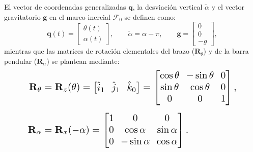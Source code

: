 El vector de coordenadas generalizadas $\mathbf{q}$, la desviación vertical $\tilde{\alpha}$ y el vector gravitatorio $\mathbf{g}$ en el marco inercial $\mathcal{F}_0$ se definen como:
\begin{equation}
    \mathbf{q}(t) = \begin{bmatrix} \theta(t) \\ \alpha(t) \end{bmatrix}, \qquad
    \tilde{\alpha} = \alpha - \pi, \qquad
    \mathbf{g} = \begin{bmatrix} 0 \\ 0 \\ -g \end{bmatrix},
    \label{eq:marco_movil}
\end{equation}
mientras que las matrices de rotación elementales del brazo ($\mathbf{R}_\theta$) y de la barra pendular ($\mathbf{R}_\alpha$) se plantean mediante:
\begin{equation}
\resizebox{0.85\columnwidth}{!}{$\displaystyle
    \setlength{\arraycolsep}{3.5pt}
    \begin{aligned}
        \mathbf{R}_\theta &= \mathbf{R}_z(\theta) = \begin{bmatrix} \hat{i}_1 & \hat{j}_1 & \hat{k}_0 \end{bmatrix}
        = \begin{bmatrix}
            \cos\theta & -\sin\theta & 0 \\
            \sin\theta & \cos\theta & 0 \\
            0 & 0 & 1
        \end{bmatrix}, \\[4pt]
        \mathbf{R}_\alpha &= \mathbf{R}_x(-\alpha)
        = \begin{bmatrix}
            1 & 0 & 0 \\
            0 & \cos\alpha & \sin\alpha \\
            0 & -\sin\alpha & \cos\alpha
        \end{bmatrix}.
    \end{aligned}
$}
    \label{eq:rotaciones_elem}
\end{equation}


